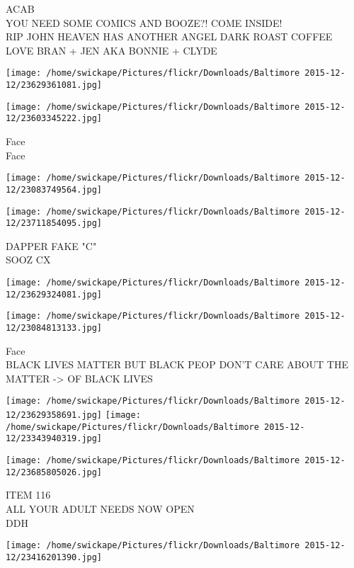 \documentclass[10pt,letterpaper]{article}
\begin{document}
ACAB\\
YOU NEED SOME COMICS AND BOOZE?!  COME INSIDE!\\
RIP JOHN HEAVEN HAS ANOTHER ANGEL DARK ROAST COFFEE LOVE BRAN + JEN AKA BONNIE + CLYDE\\
\pagebreak

\texttt{[image: /home/swickape/Pictures/flickr/Downloads/Baltimore 2015-12-12/23629361081.jpg]}

\vspace{0.25in}
\texttt{[image: /home/swickape/Pictures/flickr/Downloads/Baltimore 2015-12-12/23603345222.jpg]}

Face\\
Face\\
\pagebreak

\texttt{[image: /home/swickape/Pictures/flickr/Downloads/Baltimore 2015-12-12/23083749564.jpg]}

\vspace{0.25in}
\texttt{[image: /home/swickape/Pictures/flickr/Downloads/Baltimore 2015-12-12/23711854095.jpg]}

DAPPER FAKE "C"\\
SOOZ CX\\
\pagebreak

\texttt{[image: /home/swickape/Pictures/flickr/Downloads/Baltimore 2015-12-12/23629324081.jpg]}

\vspace{0.25in}
\texttt{[image: /home/swickape/Pictures/flickr/Downloads/Baltimore 2015-12-12/23084813133.jpg]}

Face\\
BLACK LIVES MATTER BUT BLACK PEOP DON'T CARE ABOUT THE MATTER {-}> OF BLACK LIVES\\
\pagebreak

\texttt{[image: /home/swickape/Pictures/flickr/Downloads/Baltimore 2015-12-12/23629358691.jpg]}
\texttt{[image: /home/swickape/Pictures/flickr/Downloads/Baltimore 2015-12-12/23343940319.jpg]}

\texttt{[image: /home/swickape/Pictures/flickr/Downloads/Baltimore 2015-12-12/23685805026.jpg]}

ITEM 116\\
ALL YOUR ADULT NEEDS NOW OPEN\\
DDH\\
\pagebreak

\texttt{[image: /home/swickape/Pictures/flickr/Downloads/Baltimore 2015-12-12/23416201390.jpg]}
\end{document}
